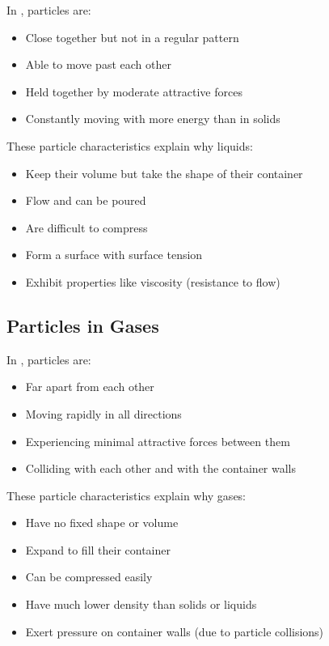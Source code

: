 In , particles are:
\begin{itemize}
    \item Close together but not in a regular pattern
    \item Able to move past each other
    \item Held together by moderate attractive forces
    \item Constantly moving with more energy than in solids
\end{itemize}

These particle characteristics explain why liquids:
\begin{itemize}
    \item Keep their volume but take the shape of their container
    \item Flow and can be poured
    \item Are difficult to compress
    \item Form a surface with surface tension
    \item Exhibit properties like viscosity (resistance to flow)
\end{itemize}


\subsection{Particles in Gases}

In , particles are:
\begin{itemize}
    \item Far apart from each other
    \item Moving rapidly in all directions
    \item Experiencing minimal attractive forces between them
    \item Colliding with each other and with the container walls
\end{itemize}

These particle characteristics explain why gases:
\begin{itemize}
    \item Have no fixed shape or volume
    \item Expand to fill their container
    \item Can be compressed easily
    \item Have much lower density than solids or liquids
    \item Exert pressure on container walls (due to particle collisions)
\end{itemize}

